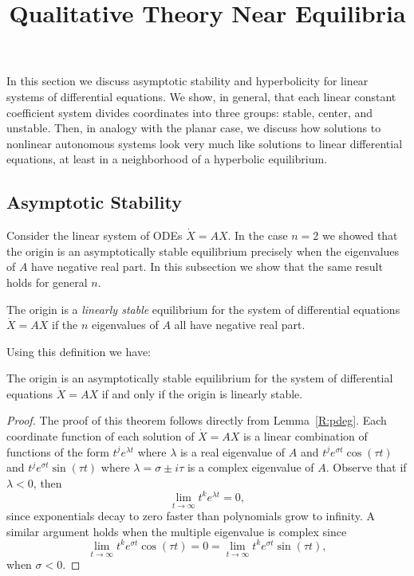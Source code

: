 \documentclass{ximera}
\title{Qualitative Theory Near Equilibria}
\begin{document}
\begin{abstract}
\end{abstract}
\maketitle


\label{S:QT}


In this section we discuss asymptotic stability and hyperbolicity for 
linear systems of differential equations.  We show, in general, that 
each linear constant coefficient system divides coordinates into three
groups: stable, center, and unstable.   Then, in analogy with the 
planar case, we discuss how solutions to nonlinear autonomous systems 
look very much like solutions to linear differential equations, at least
in a neighborhood of a hyperbolic equilibrium.


\subsection*{Asymptotic Stability}


Consider the linear system of ODEs $\dot{X}=AX$.  In the case $n=2$ we showed 
that the origin is an asymptotically stable equilibrium precisely when the 
eigenvalues of $A$ have negative real part.  In this subsection we show that the 
same result holds for general $n$. 
\begin{Def}  \label{D:linstab}
The origin is a {\em linearly stable\/} equilibrium for the system 
of differential equations $\dot{X}=AX$ if the $n$ eigenvalues of $A$ 
all have negative real part.  
\end{Def}
Using this definition we have:
\begin{thm}  \label{T:linstab}
The origin is an asymptotically stable equilibrium for the system of 
differential equations $\dot{X}=AX$ if and only if the origin is linearly stable.
\end{thm}

\begin{proof} The proof of this theorem follows directly from Lemma~\ref{R:pdeg}.
Each coordinate function of each solution of $\dot{X}=AX$ is a linear 
combination of functions of the form $t^je^{\lambda t}$ where $\lambda$ is 
a real eigenvalue of $A$ and $t^je^{\sigma t}\cos(\tau t)$ and 
$t^je^{\sigma t}\sin(\tau t)$ where $\lambda=\sigma\pm i\tau$ is a complex
eigenvalue of $A$.  Observe that if $\lambda < 0$, then
\[
\lim_{t\to\infty}t^ke^{\lambda t} = 0,
\]
since exponentials decay to zero faster than 
polynomials grow to infinity.  A similar argument holds when the multiple 
eigenvalue is complex since 
\[
\lim_{t\to\infty}t^ke^{\sigma t}\cos(\tau t) = 0 = 
\lim_{t\to\infty}t^ke^{\sigma t}\sin(\tau t),
\]
when $\sigma < 0$.  \end{proof}
\end{document}
